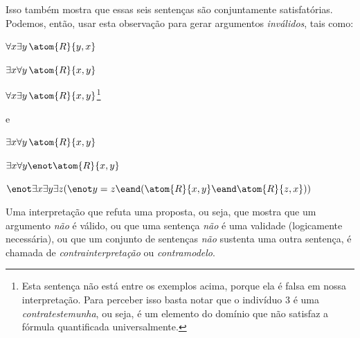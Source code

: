 Isso também mostra que essas seis sentenças são conjuntamente satisfatórias.
Podemos, então, usar esta observação para gerar argumentos \emph{inválidos}, tais como:
\begin{earg}
	\item[] $\forall x \exists y\, \atom{R}{y,x}$
	\item[] $\exists x \forall y\, \atom{R}{x,y}$
	\item[\therefore] $\forall x \exists y\, \atom{R}{x,y}$\footnote{
		Esta sentença não está entre os exemplos acima, porque ela é falsa em nossa interpretação.
		Para perceber isso basta notar que o indivíduo 3 é uma \textit{contratestemunha}, ou seja, é um elemento do domínio que não satisfaz a fórmula quantificada universalmente.}
\end{earg}
e
\begin{earg}
	\item[] $\exists x \forall y\, \atom{R}{x,y}$
	\item[] $\exists x \forall y \enot \atom{R}{x,y}$
	\item[\therefore] $\enot \exists x \exists y \exists z (\enot y = z \eand (\atom{R}{x,y} \eand \atom{R}{z,x}))$
\end{earg}

Uma interpretação que refuta uma proposta, ou seja, que mostra que um argumento \emph{não} é válido, ou que uma sentença \emph{não} é uma validade (logicamente necessária), ou que um conjunto de sentenças \emph{não} sustenta uma outra sentença, é chamada de \emph{contrainterpretação} ou \emph{contramodelo}.



\practiceproblems

